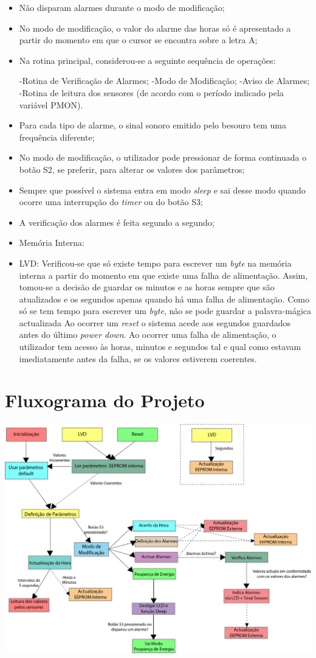 \documentclass{article}
\begin{document}
		\begin{itemize}
		\item Não disparam alarmes durante o modo de modificação;
		\item No modo de modificação, o valor do alarme das horas só é apresentado a partir do momento em que o cursor se encontra sobre a letra A;
		\item Na rotina principal, considerou-se a seguinte sequência de operações:
		
			\subitem -Rotina de Verificação de Alarmes;
			\subitem -Modo de Modificação;
			\subitem -Aviso de Alarmes;
			\subitem -Rotina de leitura dos sensores (de acordo com o período indicado pela variável PMON).
		\item Para cada tipo de alarme, o sinal sonoro emitido pelo besouro tem uma frequência diferente; 
		\item No modo de modificação, o utilizador pode pressionar de forma continuada o botão S2, se preferir, para alterar os valores dos parâmetros;
		\item Sempre que possível o sistema entra em modo \textit{sleep} e sai desse modo quando ocorre uma interrupção do \textit{timer} ou do botão S3;
		\item A verificação dos alarmes é feita segundo a segundo;
		\item Memória Interna:
			\subitem 
		\item LVD:
			\subitem Verificou-se que só existe tempo para escrever um \textit{byte} na memória interna a partir do momento em que existe uma falha de alimentação. Assim, tomou-se a decisão de guardar os minutos e as horas sempre que são atualizados e os segundos apenas quando há uma falha de alimentação. Como só se tem tempo para escrever um \textit{byte}, não se pode guardar a palavra-mágica actualizada 
			Ao ocorrer um \textit{reset} o sistema acede aos segundos guardados antes do último \textit{power down}. Ao ocorrer uma falha de alimentação, o utilizador tem acesso às horas, minutos e segundos tal e qual como estavam imediatamente antes da falha, se os valores estiverem coerentes.
		
		\end{itemize}
		
		\section{Fluxograma do Projeto}
		\begin{center}
			\includegraphics[width=1\textwidth]{scemaqestados}
		\end{center}
		
	
\end{document}
